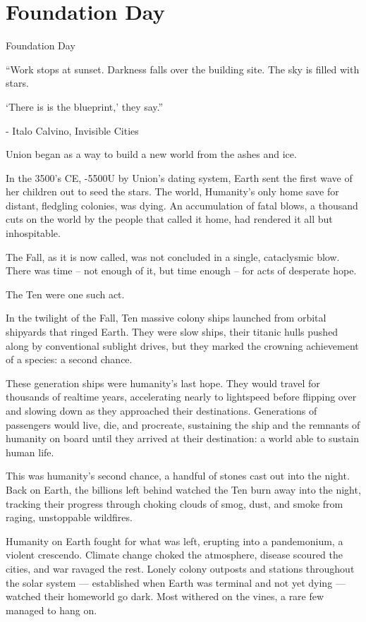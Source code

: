 \section{Foundation Day}

Foundation Day  

         “Work stops at sunset. Darkness falls over the building site. The sky is filled with stars.   

         ‘There is is the blueprint,’ they say.”  

                      -    Italo Calvino, Invisible Cities  

Union began as a way to build a new world from the ashes and ice. 
 

In the 3500’s CE, -5500U by Union’s dating system, Earth sent the first wave of her children out  
to seed the stars. The world, Humanity’s only home save for distant, fledgling colonies, was  
dying. An accumulation of fatal blows, a thousand cuts on the world by the people that called it  
home, had rendered it all but inhospitable. 
 

The Fall, as it is now called, was not concluded in a single, cataclysmic blow. There was time --  
not enough of it, but time enough -- for acts of desperate hope. 
 

The Ten were one such act. 
 

In the twilight of the Fall, Ten massive colony ships launched from orbital shipyards that ringed  
Earth. They were slow ships, their titanic hulls pushed along by conventional sublight drives, but  
they marked the crowning achievement of a species: a second chance.
 

These generation ships were humanity’s last hope. They would travel for thousands of realtime  
years, accelerating nearly to lightspeed before flipping over and slowing down as they  
approached their destinations. Generations of passengers would live, die, and procreate,  
sustaining the ship and the remnants of humanity on board until they arrived at their destination:  
a world able to sustain human life.
 

This was humanity’s second chance, a handful of stones cast out into the night. Back on Earth,  
the billions left behind watched the Ten burn away into the night, tracking their progress through  
choking clouds of smog, dust, and smoke from raging, unstoppable wildfires. 
 

Humanity on Earth fought for what was left, erupting into a pandemonium, a violent crescendo.  
Climate change choked the atmosphere, disease scoured the cities, and war ravaged the rest.  
Lonely colony outposts and stations throughout the solar system — established when Earth was  
terminal and not yet dying — watched their homeworld go dark. Most withered on the vines, a  
rare few managed to hang on. 
 

